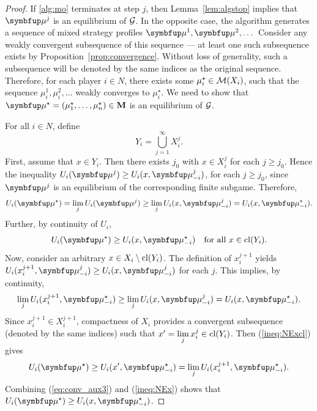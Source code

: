 \begin{proof}
	If \cref{alg:mo} terminates at step $j$, then Lemma~\ref{lem:algstop} implies that $\bmu^j$ is an equilibrium of $\mathcal{G}$. In the opposite case, the algorithm generates a sequence of mixed strategy profiles $\bmu^1, \bmu^2, \dots$ Consider any weakly convergent subsequence of this sequence --- at least one such subsequence exists by Proposition~\ref{prop:convergence}. Without loss of generality, such a subsequence will be denoted by the same indices as the original sequence. Therefore, for each player $i\in N$, there exists some $\mu^\star_i\in \mathcal{M}(X_i)$, such that the sequence $\mu_i^1,\mu_i^2,\dots$ weakly converges to $\mu_i^\star$. We need to show that  $\bmu^\star=(\mu^\star_1,\dots,\mu^\star_n)\in \bM$ is an equilibrium of $\mathcal{G}$.

	For all $i\in N$, define
	\[
		Y_i = \bigcup_{j=1}^{\infty} X^j_i.
	\]
	First, assume that $x\in Y_i$. Then there exists $j_0$ with $x\in X_i^j$ for each $j\ge j_0$. Hence the inequality $U_i(\bmu^j) \geq U_i(x,\bmu_{-i}^j)$, for each $j\ge j_0$, since $\bmu^j$ is an equilibrium of the corresponding finite subgame. Therefore,
	\[
		U_i(\bmu^\star) = \lim_{j}U_i(\bmu^j) \geq \lim_{j} U_i(x,\bmu_{-i}^j) = U_i(x,\bmu_{-i}^\star).
	\]
	Further, by continuity of $U_i$,
	\begin{equation}\label{ineq:NExcl}
		U_i(\bmu^\star) \geq  U_i(x,\bmu_{-i}^\star) \quad \text{for all } x\in\cl(Y_i).
	\end{equation}
	Now, consider an arbitrary $x\in X_i\setminus \operatorname{cl}(Y_i)$. The definition of $x_{i}^{j+1}$ yields $U_i(x_{i}^{j+1},\bmu^j_{-i}) \geq U_i(x,\bmu^j_{-i})$ for each $j$. This implies, by continuity,
	\begin{equation}\label{eq:conv_aux3}
		\lim_{j} U_i(x_{i}^{j+1},\bmu_{-i}^\star) \geq \lim_{j} U_i(x,\bmu^j_{-i}) =  U_i(x,\bmu_{-i}^\star).
	\end{equation}
	Since $x_{i}^{j+1}\in X_i^{j+1}$, compactness of $X_i$ provides a convergent subsequence (denoted by the same indices) such that $ x'= \lim\limits_j x_i^{j} \in \operatorname{cl}(Y_i)$. Then (\ref{ineq:NExcl}) gives
	\begin{equation}\label{ineq:NEx}
		U_i(\bmu^\star)\ge U_i(x',\bmu_{-i}^\star) =\lim_{j} U_i(x_{i}^{j+1},\bmu_{-i}^\star).
	\end{equation}
	Combining (\ref{eq:conv_aux3}) and (\ref{ineq:NEx}) shows that $U_i(\bmu^\star) \geq  U_i(x,\bmu_{-i}^\star)$.
\end{proof}

